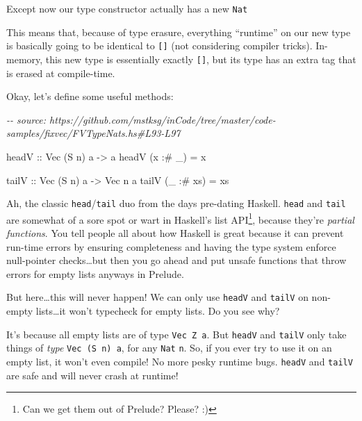 \documentclass[]{article}
\newenvironment{Shaded}{}{}
\newcommand{\CommentTok}[1]{\textcolor[rgb]{0.38,0.63,0.69}{\textit{#1}}}
\newcommand{\DataTypeTok}[1]{\textcolor[rgb]{0.56,0.13,0.00}{#1}}
\newcommand{\NormalTok}[1]{#1}
\newcommand{\OperatorTok}[1]{\textcolor[rgb]{0.40,0.40,0.40}{#1}}
\newcommand{\OtherTok}[1]{\textcolor[rgb]{0.00,0.44,0.13}{#1}}
\begin{document}
Except now our type constructor actually has a new \texttt{Nat}

This means that, because of type erasure, everything ``runtime'' on our new type
is basically going to be identical to \texttt{{[}{]}} (not considering compiler
tricks). In-memory, this new type is essentially exactly \texttt{{[}{]}}, but
its type has an extra tag that is erased at compile-time.

Okay, let's define some useful methods:

\begin{Shaded}
\begin{Highlighting}[]
\CommentTok{{-}{-} source: https://github.com/mstksg/inCode/tree/master/code{-}samples/fixvec/FVTypeNats.hs\#L93{-}L97}

\OtherTok{headV ::} \DataTypeTok{Vec}\NormalTok{ (}\DataTypeTok{S}\NormalTok{ n) a }\OtherTok{{-}>}\NormalTok{ a}
\NormalTok{headV (x }\OperatorTok{:\#}\NormalTok{ \_)  }\OtherTok{=}\NormalTok{ x}

\OtherTok{tailV ::} \DataTypeTok{Vec}\NormalTok{ (}\DataTypeTok{S}\NormalTok{ n) a }\OtherTok{{-}>} \DataTypeTok{Vec}\NormalTok{ n a}
\NormalTok{tailV (\_ }\OperatorTok{:\#}\NormalTok{ xs) }\OtherTok{=}\NormalTok{ xs}
\end{Highlighting}
\end{Shaded}

Ah, the classic \texttt{head}/\texttt{tail} duo from the days pre-dating
Haskell. \texttt{head} and \texttt{tail} are somewhat of a sore spot or wart in
Haskell's list API\footnote{Can we get them out of Prelude? Please? :)}, because
they're \emph{partial functions}. You tell people all about how Haskell is great
because it can prevent run-time errors by ensuring completeness and having the
type system enforce null-pointer checks\ldots but then you go ahead and put
unsafe functions that throw errors for empty lists anyways in Prelude.

But here\ldots this will never happen! We can only use \texttt{headV} and
\texttt{tailV} on non-empty lists\ldots it won't typecheck for empty lists. Do
you see why?

It's because all empty lists are of type \texttt{Vec\ Z\ a}. But \texttt{headV}
and \texttt{tailV} only take things of \emph{type} \texttt{Vec\ (S\ n)\ a}, for
any \texttt{Nat} \texttt{n}. So, if you ever try to use it on an empty list, it
won't even compile! No more pesky runtime bugs. \texttt{headV} and
\texttt{tailV} are safe and will never crash at runtime!
\end{document}
